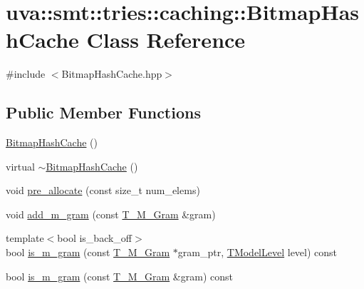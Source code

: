 \hypertarget{classuva_1_1smt_1_1tries_1_1caching_1_1_bitmap_hash_cache}{}\section{uva\+:\+:smt\+:\+:tries\+:\+:caching\+:\+:Bitmap\+Hash\+Cache Class Reference}
\label{classuva_1_1smt_1_1tries_1_1caching_1_1_bitmap_hash_cache}


{\ttfamily \#include $<$Bitmap\+Hash\+Cache.\+hpp$>$}

\subsection*{Public Member Functions}
\begin{DoxyCompactItemize}
\item 
\hyperlink{classuva_1_1smt_1_1tries_1_1caching_1_1_bitmap_hash_cache_a4d8b5eafc27e5270795505c9018e5228}{Bitmap\+Hash\+Cache} ()
\item 
virtual \hyperlink{classuva_1_1smt_1_1tries_1_1caching_1_1_bitmap_hash_cache_ad69c96b30c7a4448a51df194c43b8683}{$\sim$\+Bitmap\+Hash\+Cache} ()
\item 
void \hyperlink{classuva_1_1smt_1_1tries_1_1caching_1_1_bitmap_hash_cache_ad96d49d81dd292e1e6d50bb04e69f9e6}{pre\+\_\+allocate} (const size\+\_\+t num\+\_\+elems)
\item 
void \hyperlink{classuva_1_1smt_1_1tries_1_1caching_1_1_bitmap_hash_cache_ad43df9158968907e1dcadd206df4d7b9}{add\+\_\+m\+\_\+gram} (const \hyperlink{structuva_1_1smt_1_1tries_1_1mgrams_1_1_t___m___gram}{T\+\_\+\+M\+\_\+\+Gram} \&gram)
\item 
{\footnotesize template$<$bool is\+\_\+back\+\_\+off$>$ }\\bool \hyperlink{classuva_1_1smt_1_1tries_1_1caching_1_1_bitmap_hash_cache_a478b77041d1731d87fed291f18059668}{is\+\_\+m\+\_\+gram} (const \hyperlink{structuva_1_1smt_1_1tries_1_1mgrams_1_1_t___m___gram}{T\+\_\+\+M\+\_\+\+Gram} $\ast$gram\+\_\+ptr, \hyperlink{namespaceuva_1_1smt_1_1tries_a20577a44b3a42d26524250634379b7cb}{T\+Model\+Level} level) const 
\item 
bool \hyperlink{classuva_1_1smt_1_1tries_1_1caching_1_1_bitmap_hash_cache_ac81e446a163384c848f3409029e17342}{is\+\_\+m\+\_\+gram} (const \hyperlink{structuva_1_1smt_1_1tries_1_1mgrams_1_1_t___m___gram}{T\+\_\+\+M\+\_\+\+Gram} \&gram) const 
\end{DoxyCompactItemize}


